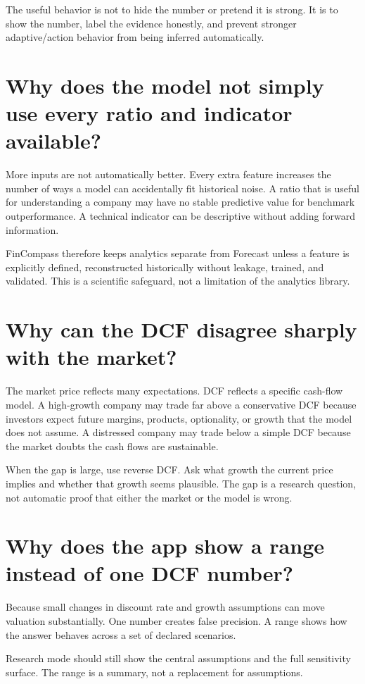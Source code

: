 \documentclass[11pt]{article}
\begin{document}
The useful behavior is not to hide the number or pretend it is strong. It is to show the number, label the evidence honestly, and prevent stronger adaptive/action behavior from being inferred automatically.

\section{Why does the model not simply use every ratio and indicator available?}
More inputs are not automatically better. Every extra feature increases the number of ways a model can accidentally fit historical noise. A ratio that is useful for understanding a company may have no stable predictive value for benchmark outperformance. A technical indicator can be descriptive without adding forward information.

FinCompass therefore keeps analytics separate from Forecast unless a feature is explicitly defined, reconstructed historically without leakage, trained, and validated. This is a scientific safeguard, not a limitation of the analytics library.

\section{Why can the DCF disagree sharply with the market?}
The market price reflects many expectations. DCF reflects a specific cash-flow model. A high-growth company may trade far above a conservative DCF because investors expect future margins, products, optionality, or growth that the model does not assume. A distressed company may trade below a simple DCF because the market doubts the cash flows are sustainable.

When the gap is large, use reverse DCF. Ask what growth the current price implies and whether that growth seems plausible. The gap is a research question, not automatic proof that either the market or the model is wrong.

\section{Why does the app show a range instead of one DCF number?}
Because small changes in discount rate and growth assumptions can move valuation substantially. One number creates false precision. A range shows how the answer behaves across a set of declared scenarios.

Research mode should still show the central assumptions and the full sensitivity surface. The range is a summary, not a replacement for assumptions.
\end{document}
